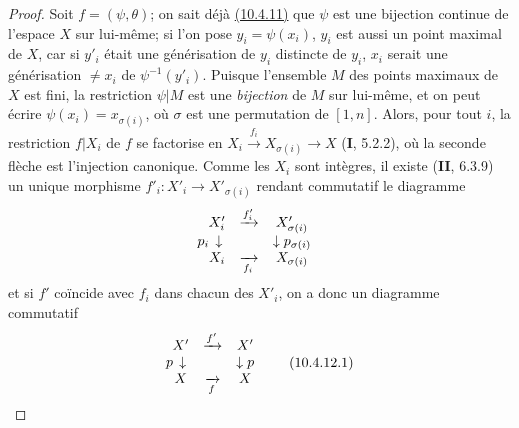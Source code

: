 \begin{proof}
Soit $f=(\psi,\theta)$; on sait déjà
{\hyperref[canon-index.ega4.c04.statement.10-4-11]{(10.4.11)}} que $\psi$ est une
bijection continue de l'espace $X$ sur lui-même; si l'on pose
$y_i=\psi(x_i)$, $y_i$ est aussi un point maximal de $X$, car si $y'_i$
était une générisation de $y_i$ distincte de $y_i$, $x_i$ serait une
générisation $\neq x_i$ de $\psi^{-1}(y'_i)$. Puisque l'ensemble $M$
des points maximaux de $X$ est fini, la restriction $\psi|M$ est une
\emph{bijection} de $M$ sur lui-même, et on peut écrire
$\psi(x_i)=x_{\sigma(i)}$, où $\sigma$ est une permutation de
$[1,n]$. Alors, pour tout $i$, la restriction $f|X_i$ de $f$ se
factorise en $X_i\xrightarrow{f_i}X_{\sigma(i)}\longrightarrow X$
(\textbf{I}, 5.2.2), où la seconde flèche est l'injection canonique. Comme les
$X_i$ sont intègres, il existe (\textbf{II}, 6.3.9) un unique morphisme
$f'_i:X'_i\to X'_{\sigma(i)}$ rendant commutatif le diagramme
\[
\begin{array}{ccc}
X'_i&\xrightarrow{f'_i}&X'_{\sigma(i)}\\
\llap{$p_i$\,}\downarrow&&\downarrow p_{\sigma(i)}\\
X_i&\xrightarrow[f_i]{}&X_{\sigma(i)}
\end{array}
\]
et si $f'$ coïncide avec $f_i$ dans chacun des $X'_i$, on a donc un
diagramme commutatif
\begin{equation}
\label{IV.10.4.12.1.errata}
\begin{array}{ccc}
X'&\xrightarrow{f'}&X'\\
\llap{$p$\,}\downarrow&&\downarrow p\\
X&\xrightarrow[f]{}&X
\end{array}
\tag{10.4.12.1}
\end{equation}


\end{proof}
